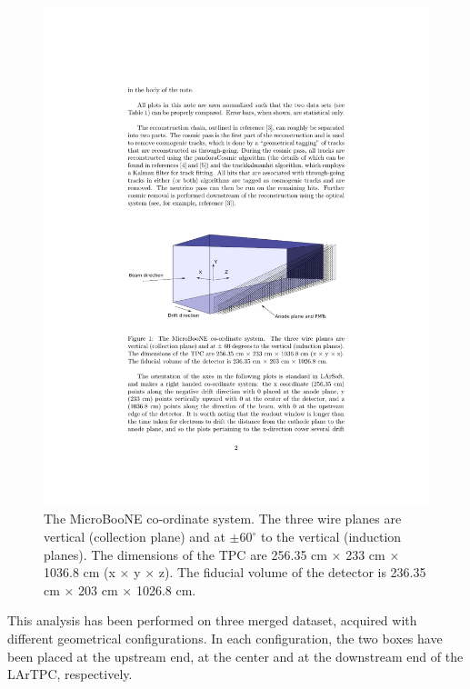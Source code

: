 \documentclass[a4paper]{scrartcl}
\begin{document}
 \begin{figure}[htbp]
 \begin{center}
 \includegraphics[width=0.8\linewidth]{figures/coord.pdf}

 \caption{The MicroBooNE co-ordinate system. The three wire planes are vertical (collection plane) and at  $\pm60^{\circ}$ to the vertical (induction planes). The dimensions of the TPC are 256.35 cm $\times$ 233 cm $\times$ 1036.8 cm (x $\times$ y $\times$ z). The fiducial volume of the detector is 236.35 cm $\times$ 203 cm $\times$ 1026.8 cm.} \label{fig:coord}
 \end{center}
 \end{figure}

This analysis has been performed on three merged dataset, acquired with different geometrical configurations. In each configuration, the two boxes have been placed at the upstream end, at the center and at the downstream end of the LArTPC, respectively.
\end{document}
